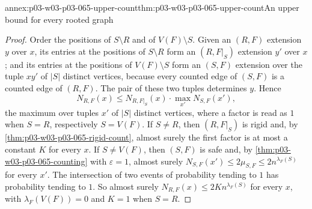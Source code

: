 \begin{annexitem}{annex:p03-w03-p03-065-upper-count}{thm:p03-w03-p03-065-upper-count}{An upper bound for every rooted graph}
\begin{proof}
Order the positions of \(S\setminus R\) and of \(V(F)\setminus S\).  Given an
\((R,F)\) extension \(y\) over \(x\), its entries at the positions of
\(S\setminus R\) form an \((R,F|_S)\) extension \(y'\) over \(x\); and its
entries at the positions of \(V(F)\setminus S\) form an \((S,F)\) extension
over the tuple \(xy'\) of \(|S|\) distinct vertices, because every counted
edge of \((S,F)\) is a counted edge of \((R,F)\).  The pair of these two
tuples determines \(y\).  Hence
\[
  N_{R,F}(x)\leq N_{R,F|_S}(x)\cdot\max_{x'}N_{S,F}(x'),
\]
the maximum over tuples \(x'\) of \(|S|\) distinct vertices, where a factor is
read as \(1\) when \(S=R\), respectively \(S=V(F)\).  If \(S\neq R\), then
\((R,F|_S)\) is rigid and, by \cref{thm:p03-w03-p03-065-rigid-count},
almost surely the first factor is at most a constant \(K\) for every \(x\).
If \(S\neq V(F)\), then \((S,F)\) is safe and, by
\cref{thm:p03-w03-p03-065-counting} with \(\varepsilon=1\), almost surely
\(N_{S,F}(x')\leq2\mu_{S,F}\leq2n^{\lambda_F(S)}\) for every \(x'\).  The
intersection of two events of probability tending to \(1\) has probability
tending to \(1\).  So almost surely \(N_{R,F}(x)\leq2Kn^{\lambda_F(S)}\) for
every \(x\), with \(\lambda_F(V(F))=0\) and \(K=1\) when \(S=R\).
\end{proof}
\end{annexitem}

